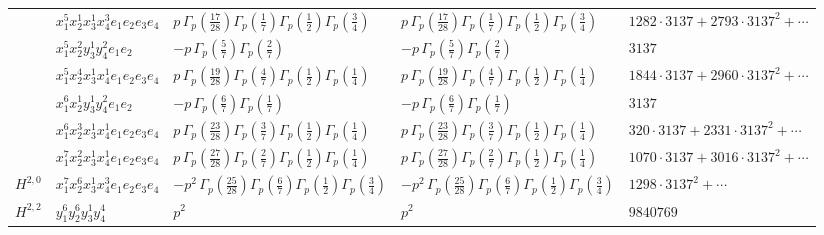 \documentclass[11pt]{article}
\begin{document}
\begin{table}[ht]
{\begin{tabular}{@{}lllll@{}}
 & $x_{1}^{5} x_{2}^{1} x_{3}^{1} x_{4}^{3}  e_{1} e_{2} e_{3} e_{4}$ & $p \, \Gamma_p \left( \frac{17}{28} \right) \Gamma_p \left( \frac{1}{7} \right) \Gamma_p \left( \frac{1}{2} \right) \Gamma_p \left( \frac{3}{4} \right)$ & $p \, \Gamma_p \left( \frac{17}{28} \right) \Gamma_p \left( \frac{1}{7} \right) \Gamma_p \left( \frac{1}{2} \right) \Gamma_p \left( \frac{3}{4} \right)$ & $1282{\cdot}3137{+}2793{\cdot}3137^{2}{+}\cdots$ \\
 & $x_{1}^{5} x_{2}^{2} y_{3}^{1} y_{4}^{2} e_{1} e_{2}$ & $- p \, \Gamma_p \left( \frac{5}{7} \right) \Gamma_p \left( \frac{2}{7} \right)$ & $- p \, \Gamma_p \left( \frac{5}{7} \right) \Gamma_p \left( \frac{2}{7} \right)$ & $3137$ \\
 & $x_{1}^{5} x_{2}^{4} x_{3}^{1} x_{4}^{1}  e_{1} e_{2} e_{3} e_{4}$ & $p \, \Gamma_p \left( \frac{19}{28} \right) \Gamma_p \left( \frac{4}{7} \right) \Gamma_p \left( \frac{1}{2} \right) \Gamma_p \left( \frac{1}{4} \right)$ & $p \, \Gamma_p \left( \frac{19}{28} \right) \Gamma_p \left( \frac{4}{7} \right) \Gamma_p \left( \frac{1}{2} \right) \Gamma_p \left( \frac{1}{4} \right)$ & $1844{\cdot}3137{+}2960{\cdot}3137^{2}{+}\cdots$ \\
 & $x_{1}^{6} x_{2}^{1} y_{3}^{1} y_{4}^{2} e_{1} e_{2}$ & $- p \, \Gamma_p \left( \frac{6}{7} \right) \Gamma_p \left( \frac{1}{7} \right)$ & $- p \, \Gamma_p \left( \frac{6}{7} \right) \Gamma_p \left( \frac{1}{7} \right)$ & $3137$ \\
 & $x_{1}^{6} x_{2}^{3} x_{3}^{1} x_{4}^{1}  e_{1} e_{2} e_{3} e_{4}$ & $p \, \Gamma_p \left( \frac{23}{28} \right) \Gamma_p \left( \frac{3}{7} \right) \Gamma_p \left( \frac{1}{2} \right) \Gamma_p \left( \frac{1}{4} \right)$ & $p \, \Gamma_p \left( \frac{23}{28} \right) \Gamma_p \left( \frac{3}{7} \right) \Gamma_p \left( \frac{1}{2} \right) \Gamma_p \left( \frac{1}{4} \right)$ & $320{\cdot}3137{+}2331{\cdot}3137^{2}{+}\cdots$ \\
 & $x_{1}^{7} x_{2}^{2} x_{3}^{1} x_{4}^{1}  e_{1} e_{2} e_{3} e_{4}$ & $p \, \Gamma_p \left( \frac{27}{28} \right) \Gamma_p \left( \frac{2}{7} \right) \Gamma_p \left( \frac{1}{2} \right) \Gamma_p \left( \frac{1}{4} \right)$ & $p \, \Gamma_p \left( \frac{27}{28} \right) \Gamma_p \left( \frac{2}{7} \right) \Gamma_p \left( \frac{1}{2} \right) \Gamma_p \left( \frac{1}{4} \right)$ & $1070{\cdot}3137{+}3016{\cdot}3137^{2}{+}\cdots$ \\
\midrule
$H^{2,0}$ & $x_{1}^{7} x_{2}^{6} x_{3}^{1} x_{4}^{3}  e_{1} e_{2} e_{3} e_{4}$ & $- p^{2} \, \Gamma_p \left( \frac{25}{28} \right) \Gamma_p \left( \frac{6}{7} \right) \Gamma_p \left( \frac{1}{2} \right) \Gamma_p \left( \frac{3}{4} \right)$ & $- p^{2} \, \Gamma_p \left( \frac{25}{28} \right) \Gamma_p \left( \frac{6}{7} \right) \Gamma_p \left( \frac{1}{2} \right) \Gamma_p \left( \frac{3}{4} \right)$ & $1298{\cdot}3137^{2}{+}\cdots$ \\
\midrule
$H^{2,2}$ & $y_{1}^{6} y_{2}^{6} y_{3}^{1} y_{4}^{4}$ & $p^{2} \,$ & $p^{2} \,$ & $9840769$ \\
\bottomrule
\end{tabular}
}
\renewcommand{\arraystretch}{1.0}
\end{table}
\end{document}
